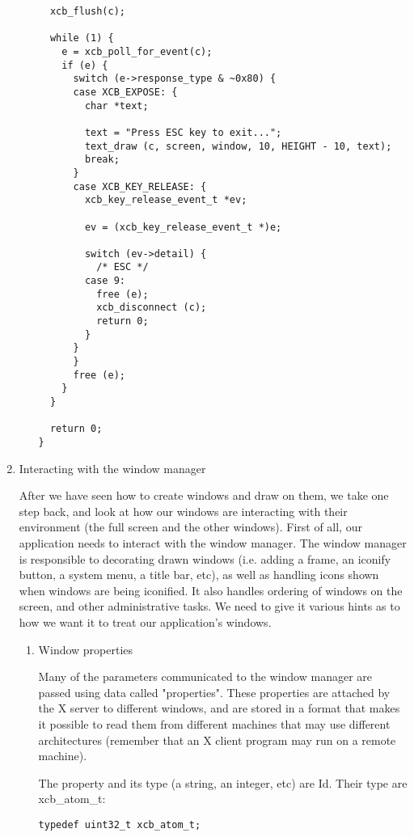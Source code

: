 \documentclass[12pt,oneside,titlepage]{book}
\begin{document}
\begin{enumerate}
\begin{enumerate}
\begin{verbatim}
  xcb_flush(c);

  while (1) {
    e = xcb_poll_for_event(c);
    if (e) {
      switch (e->response_type & ~0x80) {
      case XCB_EXPOSE: {
        char *text;

        text = "Press ESC key to exit...";
        text_draw (c, screen, window, 10, HEIGHT - 10, text);
        break;
      }
      case XCB_KEY_RELEASE: {
        xcb_key_release_event_t *ev;

        ev = (xcb_key_release_event_t *)e;

        switch (ev->detail) {
          /* ESC */
        case 9:
          free (e);
          xcb_disconnect (c);
          return 0;
        }
      }
      }
      free (e);
    }
  }

  return 0;
}
\end{verbatim}
  \end{enumerate}
\item
  \protect\hypertarget{wm}{}{Interacting with the window manager}

  After we have seen how to create windows and draw on them, we take one
  step back, and look at how our windows are interacting with their
  environment (the full screen and the other windows). First of all, our
  application needs to interact with the window manager. The window
  manager is responsible to decorating drawn windows (i.e. adding a
  frame, an iconify button, a system menu, a title bar, etc), as well as
  handling icons shown when windows are being iconified. It also handles
  ordering of windows on the screen, and other administrative tasks. We
  need to give it various hints as to how we want it to treat our
  application's windows.

  \begin{enumerate}
  \item
    \protect\hypertarget{wmprop}{}{Window properties}

    Many of the parameters communicated to the window manager are passed
    using data called "properties". These properties are attached by the
    X server to different windows, and are stored in a format that makes
    it possible to read them from different machines that may use
    different architectures (remember that an X client program may run
    on a remote machine).

    The property and its type (a string, an integer, etc) are Id. Their
    type are {xcb\_atom\_t}:

\begin{verbatim}
typedef uint32_t xcb_atom_t;
\end{verbatim}


\end{enumerate}
\end{enumerate}
\end{document}
